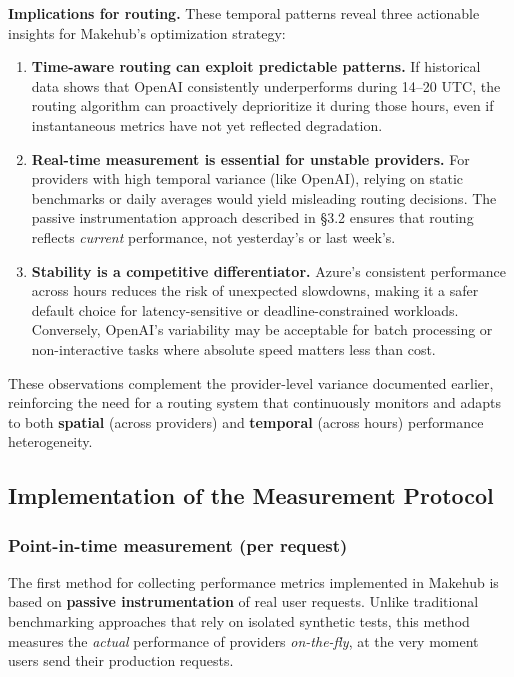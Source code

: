 \documentclass[english]{article}
\begin{document}
\medskip

\noindent\textbf{Implications for routing.} These temporal patterns reveal three actionable insights for Makehub's optimization strategy:

\begin{enumerate}
\item \textbf{Time-aware routing can exploit predictable patterns.} If historical data shows that OpenAI consistently underperforms during 14--20 UTC, the routing algorithm can proactively deprioritize it during those hours, even if instantaneous metrics have not yet reflected degradation.

\item \textbf{Real-time measurement is essential for unstable providers.} For providers with high temporal variance (like OpenAI), relying on static benchmarks or daily averages would yield misleading routing decisions. The passive instrumentation approach described in §3.2 ensures that routing reflects \emph{current} performance, not yesterday's or last week's.

\item \textbf{Stability is a competitive differentiator.} Azure's consistent performance across hours reduces the risk of unexpected slowdowns, making it a safer default choice for latency-sensitive or deadline-constrained workloads. Conversely, OpenAI's variability may be acceptable for batch processing or non-interactive tasks where absolute speed matters less than cost.
\end{enumerate}

\medskip

\noindent These observations complement the provider-level variance documented earlier, reinforcing the need for a routing system that continuously monitors and adapts to both \textbf{spatial} (across providers) and \textbf{temporal} (across hours) performance heterogeneity.

\subsection{Implementation of the Measurement Protocol}

\subsubsection{Point-in-time measurement (per request)}

The first method for collecting performance metrics implemented in Makehub is based on \textbf{passive instrumentation} of real user requests. Unlike traditional benchmarking approaches that rely on isolated synthetic tests, this method measures the \emph{actual} performance of providers \emph{on-the-fly}, at the very moment users send their production requests.
\end{document}
